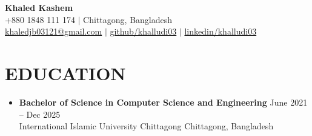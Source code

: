 \documentclass[10pt]{article} %
\newenvironment{rSection}[1]{
  \section*{#1}
}{
  \vspace{-5pt}
}
\begin{document}

\begin{center}
    {\Huge \bfseries Khaled Kashem} \\
    \vspace{3pt}
    +880 1848 111 174 $|$ Chittagong, Bangladesh \\
    \vspace{1pt}
    \href{mailto:khaledjb03121@gmail.com}{khaledjb03121@gmail.com} $|$
    \href{https://github.com/khalludi03}{github/khalludi03} $|$
    \href{https://linkedin.com/in/khalludi03}{linkedin/khalludi03}
\end{center}

\vspace{6pt}


\begin{rSection}{EDUCATION}
\vspace{10pt}
\begin{itemize}[label={}, leftmargin=0pt, itemsep=0pt, parsep=0pt]
    \item \textbf{Bachelor of Science in Computer Science and Engineering} \hfill June 2021 -- Dec 2025 \\
          International Islamic University Chittagong \hfill Chittagong, Bangladesh
\end{itemize}
\end{rSection}

\vspace{6pt}

\end{document}
